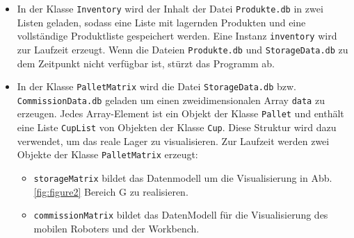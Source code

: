     \begin{itemize}
        \item In der Klasse \verb|Inventory| wird der Inhalt der Datei \verb|Produkte.db| in zwei Listen geladen, sodass
        eine Liste mit lagernden Produkten und eine vollständige Produktliste gespeichert werden.
        Eine Instanz \verb|inventory| wird zur Laufzeit erzeugt. Wenn die Dateien \verb|Produkte.db| und
        \verb|StorageData.db| zu dem Zeitpunkt nicht verfügbar ist, stürzt das Programm ab.
        \item In der Klasse \verb|PalletMatrix| wird die Datei \verb|StorageData.db| bzw. \\ \verb|CommissionData.db|
        geladen um einen zweidimensionalen Array \verb|data| zu erzeugen.
        Jedes Array-Element ist ein Objekt der Klasse \verb|Pallet| und enthält eine Liste \verb|CupList| von Objekten
        der Klasse \verb|Cup|.
        Diese Struktur wird dazu verwendet, um das reale Lager zu visualisieren.
        Zur Laufzeit werden zwei Objekte der Klasse \verb|PalletMatrix| erzeugt:
        \begin{itemize}
            \item \verb|storageMatrix| bildet das Datenmodell um die Visualisierung in Abb.\ref{fig:figure2} Bereich \grqq G\glqq{} zu realisieren.
            \item \verb|commissionMatrix| bildet das DatenModell für die Visualisierung des mobilen Roboters und der
            Workbench.
        \end{itemize}
    \end{itemize}
\newpage
